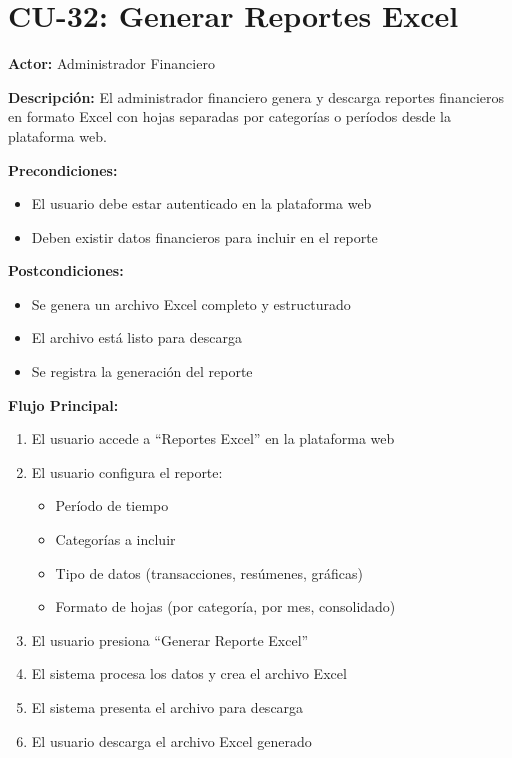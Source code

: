 \section{CU-32: Generar Reportes Excel}

\noindent\textbf{Actor:} Administrador Financiero

\noindent\textbf{Descripción:} El administrador financiero genera y descarga reportes financieros en formato Excel con hojas separadas por categorías o períodos desde la plataforma web.

\noindent\textbf{Precondiciones:}
\begin{itemize}
    \item El usuario debe estar autenticado en la plataforma web
    \item Deben existir datos financieros para incluir en el reporte
\end{itemize}

\noindent\textbf{Postcondiciones:}
\begin{itemize}
    \item Se genera un archivo Excel completo y estructurado
    \item El archivo está listo para descarga
    \item Se registra la generación del reporte
\end{itemize}

\noindent\textbf{Flujo Principal:}
\begin{enumerate}
    \item El usuario accede a ``Reportes Excel'' en la plataforma web
    \item El usuario configura el reporte:
    \begin{itemize}
        \item Período de tiempo
        \item Categorías a incluir
        \item Tipo de datos (transacciones, resúmenes, gráficas)
        \item Formato de hojas (por categoría, por mes, consolidado)
    \end{itemize}
    \item El usuario presiona ``Generar Reporte Excel''
    \item El sistema procesa los datos y crea el archivo Excel
    \item El sistema presenta el archivo para descarga
    \item El usuario descarga el archivo Excel generado
\end{enumerate}

